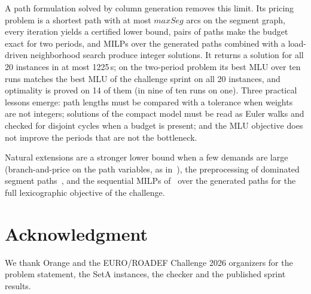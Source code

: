 \documentclass[conference]{IEEEtran}
\begin{document}
A path formulation solved by column generation removes this limit. Its pricing problem is a shortest path with at most $maxSeg$ arcs on the segment graph, every iteration yields a certified lower bound, pairs of paths make the budget exact for two periods, and MILPs over the generated paths combined with a load-driven neighborhood search produce integer solutions. It returns a solution for all 20 instances in at most 1225\,s; on the two-period problem its best MLU over ten runs matches the best MLU of the challenge sprint on all 20 instances, and optimality is proved on 14 of them (in nine of ten runs on one). Three practical lessons emerge: path lengths must be compared with a tolerance when weights are not integers; solutions of the compact model must be read as Euler walks and checked for disjoint cycles when a budget is present; and the MLU objective does not improve the periods that are not the bottleneck.

Natural extensions are a stronger lower bound when a few demands are large (branch-and-price on the path variables, as in~\cite{bouaachra2026}), the preprocessing of dominated segment paths~\cite{callebaut2023}, and the sequential MILPs of~\cite{benhamiche2026} over the generated paths for the full lexicographic objective of the challenge.

\section*{Acknowledgment}
We thank Orange and the EURO/ROADEF Challenge 2026 organizers for the problem statement, the SetA instances, the checker and the published sprint results.
\end{document}
